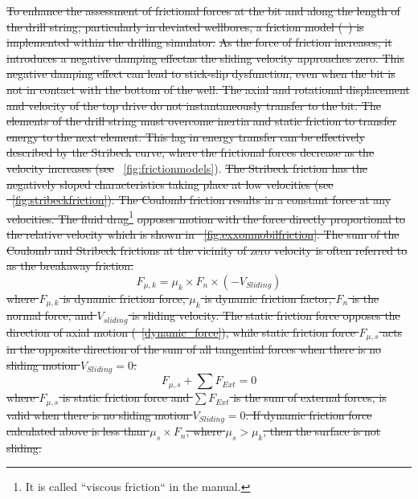 \sout{
To enhance the assessment of frictional forces at the bit and along the length of the drill string, particularly in deviated wellbores, a friction model (~\cite{ref:cayeux2020a}) is implemented within the drilling simulator.}
\sout{
As the force of friction increases, it introduces a negative damping effect}\needsclarification[How so?]\sout{as the sliding velocity approaches zero. This negative damping effect can lead to stick-slip dysfunction, even when the bit is not in contact with the bottom of the well. The axial and rotational displacement and velocity of the top drive do not instantaneously transfer to the bit. The elements of the drill string must overcome inertia and static friction to transfer energy to the next element. This lag in energy transfer can be effectively described by the Stribeck curve, where the frictional forces decrease as the velocity increases (see } \figurename~\ref{fig:frictionmodels}).
\sout{
The Stribeck friction has the negatively sloped characteristics taking place at low velocities (see \figurename~\ref{fig:stribeckfriction}). The Coulomb friction results in a constant force at any velocities. The fluid drag}\footnote{It is called ``viscous friction`` in the manual.}\sout{ opposes motion with the force directly proportional to the relative velocity which is shown in \figurename~\ref{fig:exxonmobilfriction}. The sum of the Coulomb and Stribeck frictions at the vicinity of zero velocity is often referred to as the breakaway friction.}
\begin{equation}\label{dynamic_force}
  F_{\mu,k} = \mu_{k}\times F_{n} \times (-V_{Sliding})
\end{equation}
\sout{
where $F_{\mu,k}$ is dynamic friction force, $\mu_k$ is dynamic friction factor, $F_n$ is the normal force, and $V_{sliding}$ is sliding velocity.
The static friction force opposes the direction of axial motion (\equationname~\ref{dynamic_force}), while static friction force $F_{\mu,s}$ acts in the opposite direction of the sum of all tangential forces when there is no sliding motion $V_{Sliding}=0$.}
\begin{equation}\label{zero}
  F_{\mu,s} + \sum F_{Ext} = 0
\end{equation}
\sout{
where $F_{\mu,s}$ is static friction force and $\sum F_{Ext}$ is the sum of external forces, is valid when there is no sliding motion $V_{Sliding}=0$.
If dynamic friction force calculated above is less than $\mu_{s}\times F_{n}$, where $\mu_{s} > \mu_{k}$, then the surface is not sliding.}


